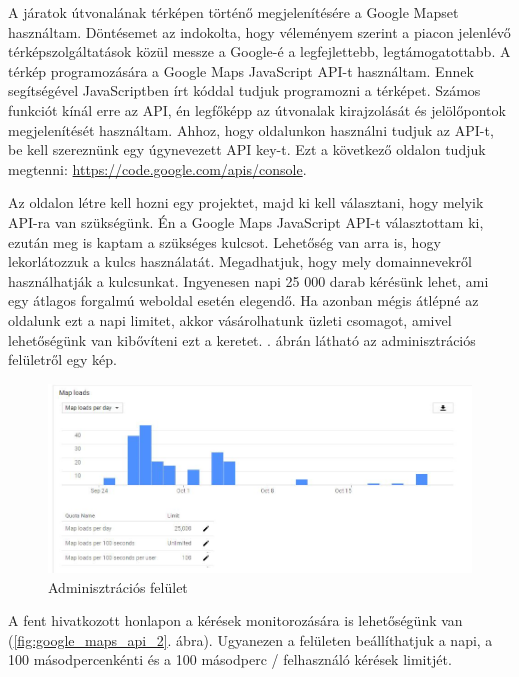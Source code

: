 
A járatok útvonalának térképen történő megjelenítésére a Google Mapset használtam. Döntésemet az indokolta, hogy véleményem szerint a piacon jelenlévő térképszolgáltatások közül messze a Google-é a legfejlettebb, legtámogatottabb. A térkép programozására a Google Maps JavaScript API-t használtam. Ennek segítségével JavaScriptben írt kóddal tudjuk programozni a térképet. Számos funkciót kínál erre az API, én legfőképp az útvonalak kirajzolását és jelölőpontok megjelenítését használtam. Ahhoz, hogy oldalunkon használni tudjuk az API-t, be kell szereznünk egy úgynevezett API key-t. Ezt a következő oldalon tudjuk megtenni: \url{https://code.google.com/apis/console}.

Az oldalon létre kell hozni egy projektet, majd ki kell választani, hogy melyik API-ra van szükségünk. Én a Google Maps JavaScript API-t választottam ki, ezután meg is kaptam a szükséges kulcsot. Lehetőség van arra is, hogy lekorlátozzuk a kulcs használatát. Megadhatjuk, hogy mely domainnevekről használhatják a kulcsunkat. Ingyenesen napi 25 000 darab kérésünk lehet, ami egy átlagos forgalmú weboldal esetén elegendő. Ha azonban mégis átlépné az oldalunk ezt a napi limitet, akkor vásárolhatunk üzleti csomagot, amivel lehetőségünk van kibővíteni ezt a keretet. . ábrán látható az adminisztrációs felületről egy kép.

\begin{figure}[h!]
\centering
\includegraphics[scale=0.5]{kepek/google_maps_api_1.jpg}
\caption{Adminisztrációs felület}
\label{fig:google_maps_api_1}
\end{figure}

A fent hivatkozott honlapon a kérések monitorozására is lehetőségünk van (\ref{fig:google_maps_api_2}. ábra). Ugyanezen a felületen beállíthatjuk a napi, a 100 másodpercenkénti és a 100 másodperc / felhasználó kérések limitjét.


